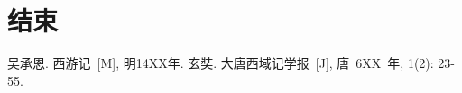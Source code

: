 \documentclass[UTF8,a4paper,10pt]{article}
\begin{document}
\section{结束}
\small
\begin{thebibliography}{99}
    \setlength{\parskip}{0pt}  %
    吴承恩. 西游记~[M], 明14XX年.
     玄奘. 大唐西域记学报~[J], 唐~6XX~年, 1(2): 23-55.
\end{thebibliography}
\clearpage
\end{document}
